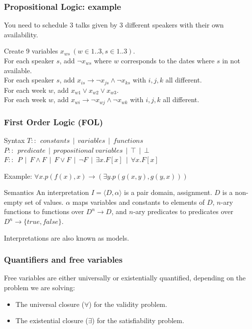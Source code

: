 \documentclass{beamer}
\begin{document}
\begin{frame}
  \frametitle{Propositional Logic: example}
  You need to schedule 3 talks given by 3 different speakers with their own availability.

  \vspace{10pt}

  Create 9 variables $x_{ws} ~ (w \in 1..3, s \in 1..3)$.\\
  For each speaker $s$, add $\neg x_{ws}$ where $w$ corresponds to the dates where $s$ in not available.\\
  For each speaker $s$, add $x_{is} \rightarrow \neg x_{js} \wedge \neg x_{ks}$ with $i,j,k$ all different.\\
  For each week $w$, add $x_{w1} \lor x_{w2} \lor x_{w3}$.\\
  For each week $w$, add $x_{wi} \rightarrow \neg x_{wj} \wedge \neg x_{wk}$ with $i,j,k$ all different.\\
  
\end{frame}

\begin{frame}
  \frametitle{First Order Logic (FOL)}
  \begin{block}{Syntax}
  $T :: ~~ \mathit{constants} ~~|~~ \mathit{variables} ~~|~~ \mathit{functions} $\\
  $P :: ~~ \mathit{predicate} ~~|~~ \mathit{propositional\ variables} ~~|~~ \top ~~|~~ \bot $\\
  $F :: ~~ P ~~|~~ F \wedge F ~~|~~ F \vee F ~~|~~ \neg F ~~|~~ \exists x. F[x] ~~|~~ \forall x. F[x]$
  \end{block}
  Example: $\forall x. p(f(x), x) \rightarrow (\exists y. p(g(x,y), g(y,x)))$
  \begin{block}{Semantics}
  An interpretation $I = \langle D, \alpha \rangle$ is a pair domain, assignment.
  $D$ is a non-empty set of values.
  $\alpha$ maps variables and constants to elements of $D$,
  $n$-ary functions to functions over $D^n \rightarrow D$,
  and $n$-ary predicates to predicates over $D^n \rightarrow \{true, false\}$.
  \end{block}
  Interpretations are also known as models.
\end{frame}

\begin{frame}
  \frametitle{Quantifiers and free variables}
  Free variables are either universally or existentially quantified, depending on the problem we are solving:

  \begin{itemize}
  \item The universal closure ($\forall$) for the validity problem.
  \item The existential closure ($\exists$) for the satisfiability problem.
  \end{itemize}
\end{frame}
\end{document}
